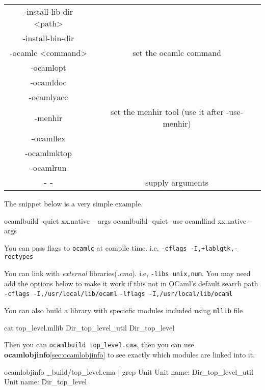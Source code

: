 \begin{longtable}{|c|c|}
-install-lib-dir <path> & \\
-install-bin-dir & \\
-ocamlc <command> & set the ocamlc command \\
-ocamlopt  & \\
-ocamldoc & \\
-ocamlyacc & \\
-menhir & set the menhir tool (use it after -use-menhir)\\
-ocamllex & \\
-ocamlmktop & \\
-ocamlrun & \\
\textbf{- -}  & supply arguments \\
\hline
\end{longtable}

The snippet below is a very simple example.

\begin{bashcode}
ocamlbuild -quiet xx.native -- args
ocamlbuild -quiet -use-ocamlfind xx.native -- args
\end{bashcode}

You can pass flags to \verb|ocamlc| at compile time. i.e,
\verb|-cflags -I,+lablgtk,-rectypes|

You can link with \textit{ external} libraries(\textit{.cma}). i.e,
\verb|-libs unix,num|.  You may need add the options below to make it
work if this not in OCaml's default search path
\verb|-cflags -I,/usr/local/lib/ocaml|
\verb|-lflags -I,/usr/local/lib/ocaml|


You can also build a library with specicfic modules included using
\verb|mllib| file

\begin{bashcode}
cat top_level.mllib    
Dir_top_level_util
Dir_top_level  
\end{bashcode}

Then you can \verb|ocamlbuild top_level.cma|, then you can use
\textbf{ocamlobjinfo}\ref{sec:ocamlobjinfo} to see exactly which
modules are linked into it.

\begin{bashcode}
ocamlobjinfo _build/top_level.cma | grep Unit  
Unit name: Dir_top_level_util
Unit name: Dir_top_level
\end{bashcode}

